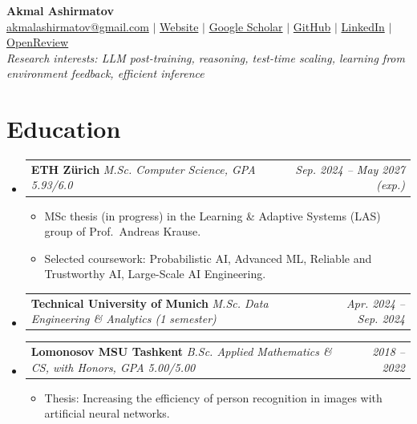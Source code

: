 \documentclass[10pt]{article}
\makeatletter
\newcommand{\resumeItem}[1]{\item #1}
\newcommand{\resumeSubheading}[3]{%
    \item\begin{tabularx}{\linewidth}[t]{@{}X@{\hspace{0.8em}}r@{}}%
    \textbf{#1} \textit{\small #2} & \textit{\small #3}\\
    \end{tabularx}\par}
\newcommand{\resumeSubHeadingListStart}{\begin{itemize}[leftmargin=1.2em,topsep=0pt,partopsep=0pt,itemsep=1pt,parsep=0pt]}
\newcommand{\resumeSubHeadingListEnd}{\end{itemize}}
\newcommand{\resumeItemListStart}{\begin{itemize}[leftmargin=1.2em,topsep=0pt,partopsep=0pt,itemsep=0pt,parsep=0pt]}
\newcommand{\resumeItemListEnd}{\end{itemize}}
\makeatother
\begin{document}
\begin{center}
    {\Large\textbf{Akmal Ashirmatov}}\\[-1pt]
    \href{mailto:akmalashirmatov@gmail.com}{akmalashirmatov@gmail.com}
    $\mid$ \href{https://akmalashirmatov.github.io/}{Website}
    $\mid$ \href{https://scholar.google.com/citations?user=TgXmbVgAAAAJ}{Google Scholar}
    $\mid$ \href{https://github.com/AkmalAshirmatov}{GitHub}
    $\mid$ \href{https://www.linkedin.com/in/akmal-ashirmatov}{LinkedIn}
    $\mid$ \href{https://openreview.net/profile?id=~Akmal_Ashirmatov1}{OpenReview}\\[1pt]
    \textit{Research interests: LLM post-training, reasoning, test-time scaling, learning from environment feedback, efficient inference}
\end{center}
\vspace{-10pt}

\section{Education}
\resumeSubHeadingListStart
    \resumeSubheading{ETH Z\"urich}{M.Sc. Computer Science, GPA 5.93/6.0}{Sep. 2024 -- May 2027 (exp.)}
        \resumeItemListStart
        \resumeItem{MSc thesis (in progress) in the Learning \& Adaptive Systems (LAS) group of Prof.\ Andreas Krause.}
        \resumeItem{Selected coursework: Probabilistic AI, Advanced ML, Reliable and Trustworthy AI, Large-Scale AI Engineering.}
        \resumeItemListEnd
    \resumeSubheading{Technical University of Munich}{M.Sc. Data Engineering \& Analytics (1 semester)}{Apr. 2024 -- Sep. 2024}
    \resumeSubheading{Lomonosov MSU Tashkent}{B.Sc. Applied Mathematics \& CS, with Honors, GPA 5.00/5.00}{2018 -- 2022}
        \resumeItemListStart
        \resumeItem{Thesis: Increasing the efficiency of person recognition in images with artificial neural networks.}
        \resumeItemListEnd
\resumeSubHeadingListEnd
\end{document}
